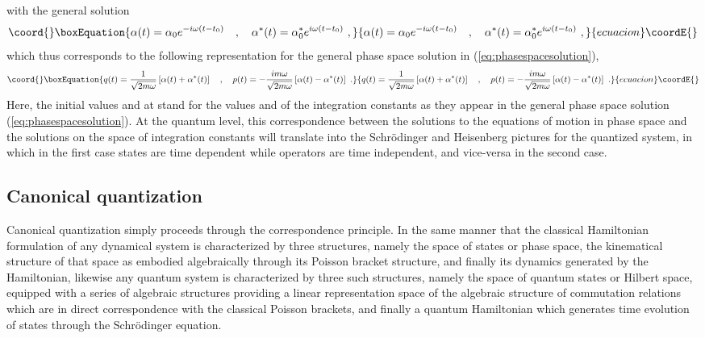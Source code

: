 \documentclass[a4paper,11pt]{article}
\begin{document}
with the general solution
\begin{equation}\coord{}\boxEquation{
\alpha(t)=\alpha_0e^{-i\omega(t-t_0)}\ \ \ ,\ \ \ 
\alpha^*(t)=\alpha_0^*e^{i\omega(t-t_0)}\ ,
}{
\alpha(t)=\alpha_0e^{-i\omega(t-t_0)}\ \ \ ,\ \ \ 
\alpha^*(t)=\alpha_0^*e^{i\omega(t-t_0)}\ ,
}{ecuacion}\coordE{}\end{equation}
which thus corresponds to the following representation for the
general phase space solution in (\ref{eq:phasespacesolution}),
\begin{equation}\coord{}\boxEquation{
q(t)=\frac{1}{\sqrt{2m\omega}}\left[\alpha(t)+\alpha^*(t)\right]\ \ \ ,\ \ \ 
p(t)=-\frac{im\omega}{\sqrt{2m\omega}}\left[\alpha(t)-\alpha^*(t)\right]\ .
\label{eq:phasespacesolution2}
}{
q(t)=\frac{1}{\sqrt{2m\omega}}\left[\alpha(t)+\alpha^*(t)\right]\ \ \ ,\ \ \ 
p(t)=-\frac{im\omega}{\sqrt{2m\omega}}\left[\alpha(t)-\alpha^*(t)\right]\ .
}{ecuacion}\coordE{}\end{equation}
Here, the initial values \coordHE{} and \coordHE{} at \coordHE{} stand for the 
values \myHighlight{$\alpha$}\coordHE{} and \myHighlight{$\alpha^*$}\coordHE{} of the integration constants as they
appear in the general phase space solution (\ref{eq:phasespacesolution}).
At the quantum level, this correspondence between the solutions to the
equations of motion in phase space and the solutions on the space of 
integration constants will translate into the Schr\"odinger and
Heisenberg pictures for the quantized system, in which in the first
case states are time dependent while operators are time independent, 
and vice-versa in the second case.

\subsection{Canonical quantization}
\label{Subsect2.3}

Canonical quantization simply proceeds through the correspondence
principle. In the same manner that the classical Hamiltonian
formulation of any dynamical system is characterized by three structures,
namely the space of states or phase space, the kinematical
structure of that space as embodied algebraically through its Poisson 
bracket structure, and finally its dynamics generated by the Hamiltonian,
likewise any quantum system is cha\-rac\-te\-ri\-zed by three such structures,
namely the space of quantum states or Hilbert space, equipped with
a series of algebraic structures providing a linear re\-pre\-sen\-ta\-tion 
space of the algebraic structure of commutation relations which are in direct
correspondence with the classical Poisson brackets, and finally a quantum 
Hamiltonian which generates time evolution of states through the 
Schr\"odinger equation.
\end{document}

